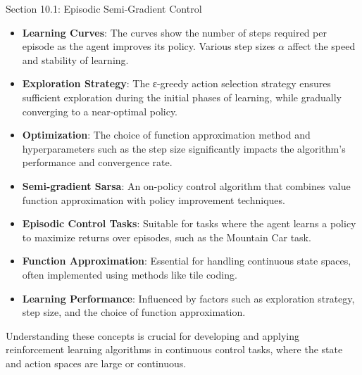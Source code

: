 \begin{notes}{Section 10.1: Episodic Semi-Gradient Control}
    \begin{highlight}
    
        \begin{itemize}
            \item \textbf{Learning Curves}: The curves show the number of steps required per episode as the agent improves its policy. Various step sizes $\alpha$ affect the speed and stability of learning.
            \item \textbf{Exploration Strategy}: The ε-greedy action selection strategy ensures sufficient exploration during the initial phases of learning, while gradually converging to a near-optimal policy.
            \item \textbf{Optimization}: The choice of function approximation method and hyperparameters such as the step size significantly impacts the algorithm's performance and convergence rate.
        \end{itemize}
    
    \end{highlight}
    
    \begin{highlight}
    
        \begin{itemize}
            \item \textbf{Semi-gradient Sarsa}: An on-policy control algorithm that combines value function approximation with policy improvement techniques.
            \item \textbf{Episodic Control Tasks}: Suitable for tasks where the agent learns a policy to maximize returns over episodes, such as the Mountain Car task.
            \item \textbf{Function Approximation}: Essential for handling continuous state spaces, often implemented using methods like tile coding.
            \item \textbf{Learning Performance}: Influenced by factors such as exploration strategy, step size, and the choice of function approximation.
        \end{itemize}
    
        Understanding these concepts is crucial for developing and applying reinforcement learning algorithms in continuous control tasks, where the state and action spaces are large or continuous.
    
    \end{highlight}
\end{notes}

